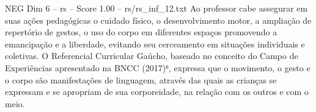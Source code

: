 \begin{textsample}{NEG Dim 6 – rs – Score 1.00 – rs/rs\_inf\_12.txt}
Ao professor cabe assegurar em suas ações pedagógicas o cuidado físico, o desenvolvimento motor, a ampliação de repertório de gestos, o uso do corpo em diferentes espaços promovendo a emancipação e a liberdade, evitando seu cerceamento em situações individuais e coletivas.
O Referencial Curricular Gaúcho, baseado no conceito do Campo de Experiências apresentado na BNCC (2017)⁶, expressa que o movimento, o gesto e o corpo são manifestações de linguagem, através das quais as crianças se expressam e se apropriam de sua corporeidade, na relação com os outros e com o meio.

\end{textsample}
